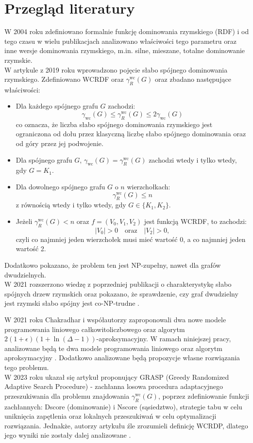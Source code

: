 \section{Przegląd literatury}
W 2004 roku zdefiniowano formalnie funkcję dominowania rzymskiego (RDF) \cite{RDF} i od tego czasu w wielu publikacjach analizowano właściwości tego parametru oraz inne wersje dominowania rzymskiego, m.in. silne, mieszane, totalne dominowanie rzymskie.\\ 
W artykule z 2019 roku \cite{theoryWCRDF} wprowadzono pojęcie słabo spójnego dominowania rzymskiego. Zdefiniowano WCRDF oraz $\gamma_{R}^{\text{wc}}(G)$ oraz zbadano następujące właściwości:
\begin{itemize}
    \item Dla każdego spójnego grafu $G$ zachodzi:
    \[
    \gamma_{\text{wc}}(G) \leq \gamma_{R}^{\text{wc}}(G) \leq 2\gamma_{\text{wc}}(G)
    \]
    co oznacza, że liczba słabo spójnego dominowania rzymskiego jest ograniczona od dołu przez klasyczną liczbę słabo spójnego dominowania oraz od góry przez jej podwojenie.

    \item Dla spójnego grafu $G$, $\gamma_{\text{wc}}(G) = \gamma_{R}^{\text{wc}}(G)$ zachodzi wtedy i tylko wtedy, gdy $G = K_1$.

    \item Dla dowolnego spójnego grafu $G$ o $n$ wierzchołkach:
    \[
    \gamma_{R}^{\text{wc}}(G) \leq n
    \]
    z równością wtedy i tylko wtedy, gdy $G \in \{K_1, K_2\}$.

    \item Jeżeli $\gamma_{R}^{\text{wc}}(G) < n$ oraz $f = (V_0, V_1, V_2)$ jest funkcją WCRDF, to zachodzi:
    \[
    |V_0| > 0 \quad \text{oraz} \quad |V_2| > 0,
    \] 
    czyli co najmniej jeden wierzchołek musi mieć wartość 0, a co najmniej jeden wartość 2.
\end{itemize}
Dodatkowo pokazano, że problem ten jest NP-zupełny, nawet dla grafów dwudzielnych.\\
W 2021 rozszerzono wiedzę z poprzedniej publikacji o charakterystykę słabo spójnych drzew rzymskich oraz pokazano, że sprawdzenie, czy graf dwudzielny jest rzymski słabo spójny jest co-NP-trudne \cite{PROGRESS}.

W 2021 roku Chakradhar i współautorzy zaproponowali dwa nowe modele programowania liniowego całkowitoliczbowego oraz algorytm $2(1+\epsilon)(1 + \ln(\Delta - 1))$-aproksymacyjny. W ramach niniejszej pracy, analizowane będą te dwa modele programowania liniowego oraz algorytm aproksymacyjny \cite{ILP}. Dodatkowo analizowane będą propozycje własne rozwiązania tego problemu.\\
W 2023 roku ukazał się artykuł proponujący GRASP (Greedy Randomized Adaptive Search Procedure) - zachłanna losowa procedura adaptacyjnego przeszukiwania dla problemu znajdowania $\gamma_{R}^{\text{wc}}(G)$, poprzez zdefiniowanie funkcji zachłannych: Dscore (dominowanie) i Nscore (sąsiedztwo), strategie tabu w celu uniknięcia zapętlenia oraz lokalnych przeszukiwań w celu optymalizacji rozwiązania. Jednakże, autorzy artykułu źle zrozumieli definicję WCRDP, dlatego jego wyniki nie zostały dalej analizowane \cite{GRASP}.

